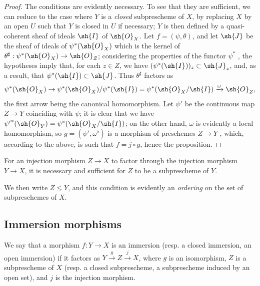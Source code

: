\begin{proof}
The conditions are evidently necessary.
To see that they are sufficient, we can reduce to the case where $Y$ is a \emph{closed} subprescheme of $X$, by replacing $X$ by an open $U$ such that $Y$ is closed in $U$  if necessary;
$Y$ is then defined by a quasi-coherent sheaf of ideals $\sh{I}$ of $\sh{O}_X$.
Let $f=(\psi,\theta)$, and let $\sh{J}$ be the sheaf of ideals of $\psi^*(\sh{O}_X)$ which is the kernel of $\theta^\sharp:\psi^*(\sh{O}_X)\to\sh{O}_Z$;
considering the properties of the functor $\psi^*$ , the hypotheses imply that, for each $z\in Z$, we have $(\psi^*(\sh{I}))_z\subset\sh{J}_z$, and, as a result, that $\psi^*(\sh{I})\subset\sh{J}$.
Thus $\theta^\sharp$ factors as
\[
  \psi^*(\sh{O}_X)\to\psi^*(\sh{O}_X)/\psi^*(\sh{I})=\psi^*(\sh{O}_X/\sh{I})\xrightarrow{\omega}\sh{O}_Z,
\]
the first arrow being the canonical homomorphism.
Let $\psi'$ be the continuous map $Z\to Y$ coinciding with $\psi$;
it is clear that we have ${\psi'}^*(\sh{O}_Y)=\psi^*(\sh{O}_X/\sh{I})$;
on the other hand, $\omega$ is evidently a local homomorphism, so $g=(\psi',\omega^\flat)$ is a morphism
of preschemes $Z\to Y$ , which, according to the above, is such that $f=j\circ g$, hence the proposition.
\end{proof}

\begin{corollary}[4.1.10]
\label{I.4.1.10}
For an injection morphism $Z\to X$ to factor through the injection morphism $Y\to X$, it is necessary and sufficient for $Z$ to be a subprescheme of $Y$.
\end{corollary}

We then write $Z\leq Y$, and this condition is evidently an \emph{ordering} on the set of subpreschemes of $X$.

\subsection{Immersion morphisms}
\label{subsection:I.4.2}

\begin{definition}[4.2.1]
\label{I.4.2.1}
We say that a morphism $f:Y\to X$ is an immersion (resp. a closed immersion, an open immersion) if it factors as $Y\xrightarrow{g}Z\xrightarrow{j}X$, where $g$ is an isomorphism, $Z$ is a subprescheme of $X$ (resp. a closed subprescheme, a subprescheme induced by an open set), and $j$ is the injection morphism.
\end{definition}

